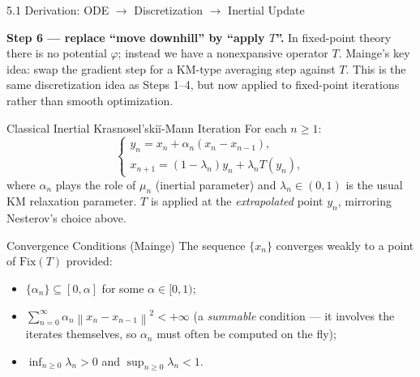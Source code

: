 \documentclass[aspectratio=169,10pt]{beamer}
\newcommand{\norm}[1]{\left\|#1\right\|}
\newcommand{\Fix}{\mathrm{Fix}}
\begin{document}
\begin{frame}[allowframebreaks]{5.1 Derivation: ODE $\to$ Discretization $\to$ Inertial Update}
  \framebreak

  \textbf{Step 6 --- replace ``move downhill'' by ``apply $T$''.}
  In fixed-point theory there is no potential $\varphi$; instead we
  have a nonexpansive operator $T$.  Mainge's key idea: swap the
  gradient step for a KM-type averaging step against $T$.  This is
  the same discretization idea as Steps 1--4, but now applied to
  fixed-point iterations rather than smooth optimization.

  \begin{block}{Classical Inertial Krasnosel'ski\u{i}-Mann Iteration}
    For each $n\ge 1$:
    \[
      \begin{cases}
        y_n = x_n + \alpha_n(x_n - x_{n-1}), \\
        x_{n+1} = (1-\lambda_n)y_n + \lambda_n T(y_n),
      \end{cases}
    \]
    where $\alpha_n$ plays the role of $\mu_n$ (inertial parameter)
    and $\lambda_n\in(0,1)$ is the usual KM relaxation parameter.
    $T$ is applied at the \emph{extrapolated} point $y_n$, mirroring
    Nesterov's choice above.
  \end{block}

  \begin{alertblock}{Convergence Conditions (Mainge)}
    The sequence $\{x_n\}$ converges weakly to a point of
    $\Fix(T)$ provided:
    \begin{itemize}
      \item[(C1)] $\{\alpha_n\}\subseteq[0,\alpha]$ for some
            $\alpha\in[0,1)$;
      \item[(C2)] $\sum_{n=0}^{\infty}\alpha_n\norm{x_n-x_{n-1}}^2
            <+\infty$ (a \emph{summable} condition --- it involves
            the iterates themselves, so $\alpha_n$ must often be
            computed on the fly);
      \item[(C3)] $\inf_{n\ge0}\lambda_n>0$ and
            $\sup_{n\ge0}\lambda_n<1$.
    \end{itemize}
  \end{alertblock}

\end{frame}
\end{document}
